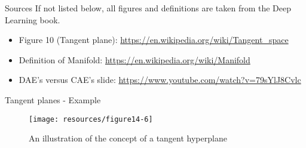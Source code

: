 \documentclass[handout]{beamer}
\begin{document}
\begin{frame}[t]{Sources}
If not listed below, all figures and definitions are taken from the Deep Learning book.
    \begin{itemize}
        \item Figure 10 (Tangent plane): \url{https://en.wikipedia.org/wiki/Tangent_space}
        \item Definition of Manifold: \url{https://en.wikipedia.org/wiki/Manifold}
\item DAE's versus CAE's slide: \url{https://www.youtube.com/watch?v=79sYlJ8Cvlc}
    \end{itemize}
\end{frame}

\begin{frame}[t]{Tangent planes - Example}
\begin{figure}[h]
    \centering
    \texttt{[image: resources/figure14-6]}
    \caption{An illustration of the concept of a tangent hyperplane}
    \label{fig:resources/figure14-6}
\end{figure}
\end{frame}
\end{document}
